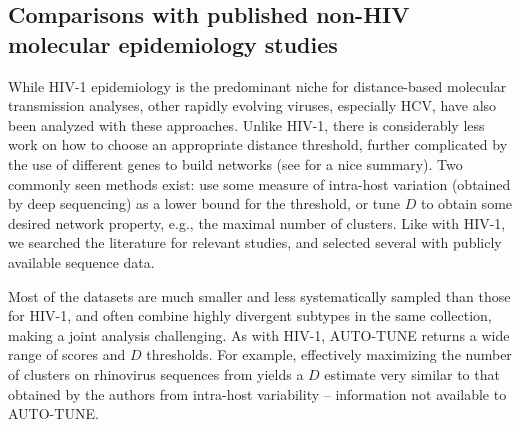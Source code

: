 \documentclass[utf8]{FrontiersinHarvard} %
\begin{document}
\subsection{Comparisons with published non-HIV molecular epidemiology studies}

While HIV-1 epidemiology is the predominant niche for distance-based molecular
transmission analyses, other rapidly evolving viruses, especially HCV, have also
been analyzed with these approaches. Unlike HIV-1, there is considerably less
work on how to choose an appropriate distance threshold, further complicated by
the use of different genes to build networks (see \citet{Chan:2020aa} for a nice
summary). Two commonly seen methods exist: use some measure of intra-host
variation (obtained by deep sequencing) as a lower bound for the threshold, or
tune $D$ to obtain some desired network property, e.g., the maximal number of
clusters. Like with HIV-1, we searched the literature for relevant studies, and
selected several with publicly available sequence data.  

Most of the datasets are much smaller and less systematically sampled than those
for HIV-1, and often combine highly divergent subtypes in the same collection,
making a joint analysis challenging. As with HIV-1, AUTO-TUNE returns a wide
range of scores and $D$ thresholds. For example, effectively maximizing the
number of clusters on rhinovirus sequences from \citet{Ng:2022aa} yields a $D$
estimate very similar to that obtained by the authors from intra-host
variability -- information not available to AUTO-TUNE.
\end{document}
